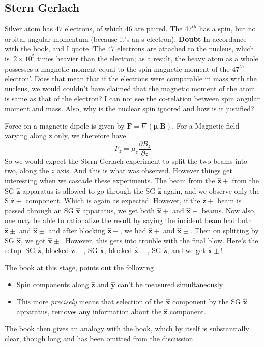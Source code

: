 \documentclass[12pt]{article}
\def\*#1{\boldsymbol{#1}}
\let\oldhat\hat
\renewcommand{\hat}[1]{\oldhat{\*{#1}}}
\begin{document}
	\subsection{Stern Gerlach}
		Silver atom has $47$ electrons, of which $46$ are paired. The $47^{th}$ has a spin, but no orbital-angular momentum (because it's an s electron). {\bf Doubt} In accordance with the book, and I quote `The $47$ electrons are attached to the nucleus, which is $~2\times 10^5$ times heavier than the electron; as a result, the heavy atom as a whole possesses a magnetic moment equal to the spin magnetic moment of the $47^{th}$ electron'. Does that mean that if the electrons were comparable in mass with the nucleus, we would couldn't have claimed that the magnetic moment of the atom is same as that of the electron? I can not see the co-relation between spin angular moment and mass. Also, why is the nuclear spin ignored and how is it justified?
		\par
		Force on a magnetic dipole is given by $\*F=\nabla(\*\mu. \*B)$. For a Magnetic field varying along z only, we therefore have
		\begin{equation}
			F_z = \mu_z \frac{\partial{B_z}}{\partial{z}}
		\end{equation}
		So we would expect the Stern Gerlach experiment to split the two beams into two, along the $z$ axis. And this is what was observed. However things get interesting when we cascade these experiments. The beam from the $\hat z +$ from the SG $\hat z$ apparatus is allowed to go through the SG $\hat z$ again, and we observe only the S $\hat z +$ component. Which is again as expected. However, if the $\hat z +$ beam is passed through an SG $\hat x$ apparatus, we get both $\hat x + $ and $\hat x -$ beams. Now also, one may be able to rationalize the result by saying the incident beam had both $\hat z \pm$ and $\hat x \pm$ and after blocking $\hat z -$, we had $\hat z +$ and $\hat x \pm$. Then on splitting by SG $\hat x$, we got $\hat x \pm$. However, this gets into trouble with the final blow. Here's the setup. SG $\hat z$, blocked $\hat z -$, SG $\hat x$, blocked $\hat x -$, SG $\hat z$, and we get $\hat x \pm$!
		\par
		The book at this stage, points out the following
		\begin{itemize}
			\item Spin components along $\hat z$ and $\hat y$ can't be measured simultaneously
			\item This more \emph{precisely} means that selection of the $\hat x$ component by the SG $\hat x$ apparatus, removes any information about the $\hat z$ component.
		\end{itemize}
		The book then gives an analogy with the book, which by itself is substantially clear, though long and has been omitted from the discussion.
\end{document}
